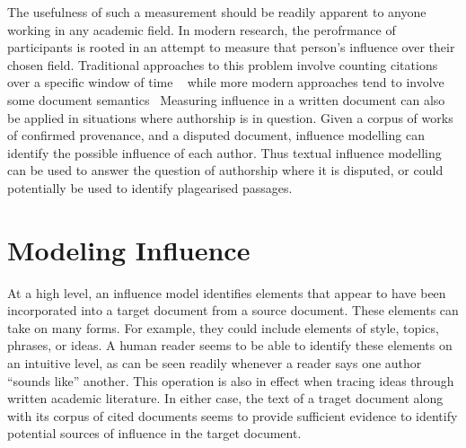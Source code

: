 \documentclass[../dissertation.tex]{subfiles}
\begin{document}
The usefulness of such a measurement should be readily apparent to
anyone working in any academic field.  In modern research, the
perofrmance of participants is rooted in an attempt to measure that
person's influence over their chosen field.  Traditional approaches to
this problem involve counting citations over a specific window of time
~\cite{adler2009} while more modern approaches tend to involve some
document semantics~\cite{dietz2007, jiang2014, **buneman**} Measuring
influence in a written document can also be applied in situations
where authorship is in question.  Given a corpus of works of confirmed
provenance, and a disputed document, influence modelling can identify
the possible influence of each author.  Thus textual influence
modelling can be used to answer the question of authorship where it is
disputed, or could potentially be used to identify plagearised
passages.


\section{Modeling Influence}
At a high level, an influence model identifies elements that appear to
have been incorporated into a target document from a source document.
These elements can take on many forms.  For example, they could
include elements of style, topics, phrases, or ideas.  A human reader
seems to be able to identify these elements on an intuitive level, as
can be seen readily whenever a reader says one author ``sounds like''
another.  This operation is also in effect when tracing ideas through
written academic literature.  In either case, the text of a traget
document along with its corpus of cited documents seems to provide
sufficient evidence to identify potential sources of influence in the
target document.
\end{document}
